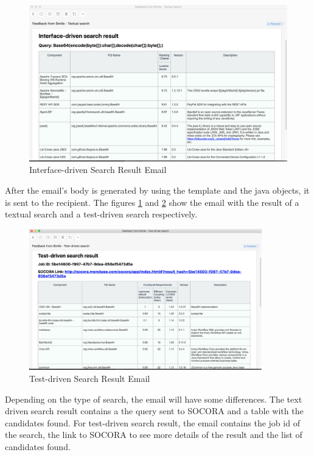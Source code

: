\begin{figure}[H]
	\centering
    \includegraphics[width=\textwidth]{grafiken/email-01}
    \caption{Interface-driven Search Result Email}
    \label{fig:email-01}
\end{figure}

After the email's body is generated by using the template and the java objects, it is sent to the recipient. The figures \ref{fig:email-01} and \ref{fig:email-02} show the email with the result of a textual search and a test-driven search respectively.

\begin{figure}[H]
	\centering
    \includegraphics[width=0.9\textwidth]{grafiken/email-02}
    \caption{Test-driven Search Result Email}
    \label{fig:email-02}
\end{figure}

Depending on the type of search, the email will have some differences. The text driven search result contains a the query sent to SOCORA and a table with the candidates found. For test-driven search result, the email contains the job id of the search, the link to SOCORA to see more details of the result and the list of candidates found.

